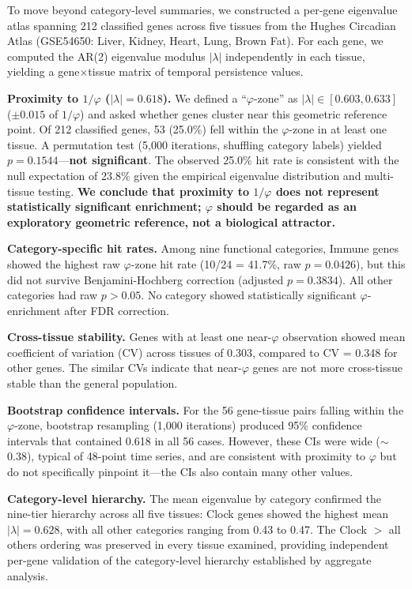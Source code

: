 \documentclass[11pt,letterpaper]{article}
\begin{document}
To move beyond category-level summaries, we constructed a per-gene eigenvalue atlas spanning 212 classified genes across five tissues from the Hughes Circadian Atlas (GSE54650: Liver, Kidney, Heart, Lung, Brown Fat). For each gene, we computed the AR(2) eigenvalue modulus $|\lambda|$ independently in each tissue, yielding a gene$\times$tissue matrix of temporal persistence values.

\textbf{Proximity to $1/\varphi$ ($|\lambda| = 0.618$).} We defined a ``$\varphi$-zone'' as $|\lambda| \in [0.603, 0.633]$ ($\pm 0.015$ of $1/\varphi$) and asked whether genes cluster near this geometric reference point. Of 212 classified genes, 53 (25.0\%) fell within the $\varphi$-zone in at least one tissue. A permutation test (5{,}000 iterations, shuffling category labels) yielded $p = 0.1544$---\textbf{not significant}. The observed 25.0\% hit rate is consistent with the null expectation of 23.8\% given the empirical eigenvalue distribution and multi-tissue testing. \textbf{We conclude that proximity to $1/\varphi$ does not represent statistically significant enrichment; $\varphi$ should be regarded as an exploratory geometric reference, not a biological attractor.}

\textbf{Category-specific hit rates.} Among nine functional categories, Immune genes showed the highest raw $\varphi$-zone hit rate (10/24 = 41.7\%, raw $p = 0.0426$), but this did not survive Benjamini-Hochberg correction (adjusted $p = 0.3834$). All other categories had raw $p > 0.05$. No category showed statistically significant $\varphi$-enrichment after FDR correction.

\textbf{Cross-tissue stability.} Genes with at least one near-$\varphi$ observation showed mean coefficient of variation (CV) across tissues of 0.303, compared to CV = 0.348 for other genes. The similar CVs indicate that near-$\varphi$ genes are not more cross-tissue stable than the general population.

\textbf{Bootstrap confidence intervals.} For the 56 gene-tissue pairs falling within the $\varphi$-zone, bootstrap resampling (1{,}000 iterations) produced 95\% confidence intervals that contained 0.618 in all 56 cases. However, these CIs were wide ($\sim$0.38), typical of 48-point time series, and are consistent with proximity to $\varphi$ but do not specifically pinpoint it---the CIs also contain many other values.

\textbf{Category-level hierarchy.} The mean eigenvalue by category confirmed the nine-tier hierarchy across all five tissues: Clock genes showed the highest mean $|\lambda| = 0.628$, with all other categories ranging from 0.43 to 0.47. The Clock $>$ all others ordering was preserved in every tissue examined, providing independent per-gene validation of the category-level hierarchy established by aggregate analysis.
\end{document}
